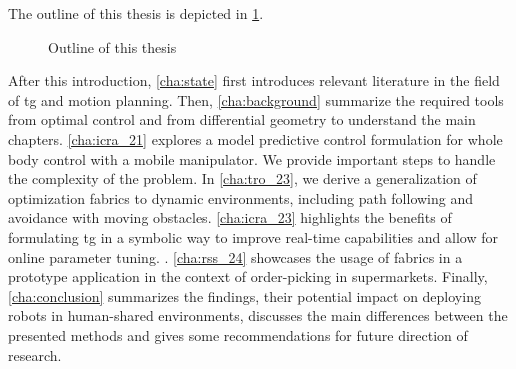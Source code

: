 The outline of this thesis is depicted in \cref{fig:outline}.
%
\begin{figure}[h]
  \begin{center}
    
  \end{center}
  \caption{Outline of this thesis}
  \label{fig:outline}
\end{figure}
After this introduction, \cref{cha:state} first introduces
relevant literature in the field of \ac{tg}
and motion planning.
Then, \cref{cha:background} summarize the required tools
from optimal control and from differential geometry to
understand the main chapters.
\cref{cha:icra_21} explores a
model predictive control formulation for whole body control
with a mobile manipulator. We provide important steps to
handle the complexity of the problem.
In \cref{cha:tro_23}, we derive a
generalization of optimization fabrics to dynamic
environments, including path following and avoidance with
moving obstacles.
\cref{cha:icra_23} highlights the benefits of
formulating \ac{tg} in a symbolic way to
improve real-time capabilities and allow for online
parameter tuning.
.
\cref{cha:rss_24} showcases the 
usage of \ac{fabrics} in a prototype application in the
context of order-picking in supermarkets.
Finally,
\cref{cha:conclusion} summarizes the findings, their potential impact
on deploying robots in human-shared environments, discusses
the main differences between the presented methods and gives some
recommendations for future direction of research.



